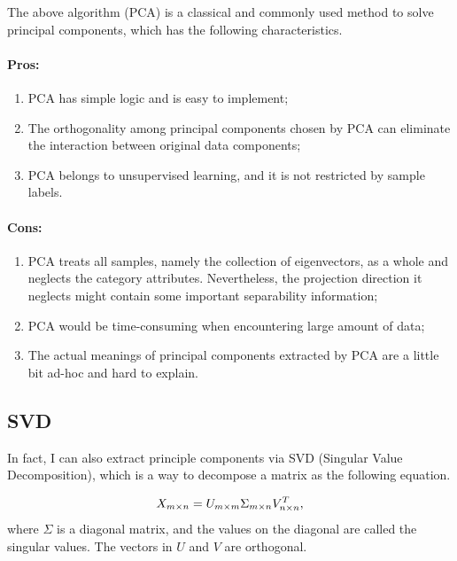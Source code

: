 \documentclass[12pt,a4paper]{article}
\theoremstyle{definition}
\begin{document}
The above algorithm (PCA) is a classical and commonly used method to solve principal components, which has the following characteristics.

\vspace{-0.012\linewidth}
\paragraph{Pros:}
\begin{enumerate}
	\item PCA has simple logic and is easy to implement;

	\item The orthogonality among principal components chosen by PCA can eliminate the interaction between original data components;

	\item PCA belongs to unsupervised learning, and it is not restricted by sample labels.
\end{enumerate}

\vspace{-0.03\linewidth}
\paragraph{Cons:}
\begin{enumerate}
	\item PCA treats all samples, namely the collection of eigenvectors, as a whole and neglects the category attributes. Nevertheless, the projection direction it neglects might contain some important separability information;
	
	\item PCA would be time-consuming when encountering large amount of data;
	
	\item The actual meanings of principal components extracted by PCA are a little bit ad-hoc and hard to explain.
\end{enumerate}

\subsection{SVD}
In fact, I can also extract principle components via SVD (Singular Value Decomposition), which is a way to decompose a matrix as the following equation. 

\begin{equation*}
	\centering
	X_{m \times n} = U_{m \times m} \Sigma_{m \times n} V^T_{n \times n},
\end{equation*}
where $\Sigma$ is a diagonal matrix, and the values on the diagonal are called the singular values. The vectors in $U$ and $V$ are orthogonal.
\end{document}
